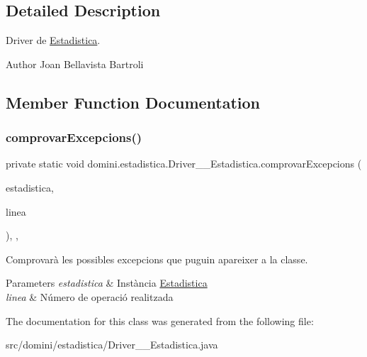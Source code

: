 \subsection{Detailed Description}
Driver de \hyperlink{classdomini_1_1estadistica_1_1Estadistica}{Estadistica}. 

\begin{DoxyAuthor}{Author}
Joan Bellavista Bartroli 
\end{DoxyAuthor}


\subsection{Member Function Documentation}
\mbox{\label{classdomini_1_1estadistica_1_1Driver____Estadistica_a3459f11af9841b23ac81a409a3e84e22}} 
\subsubsection{\texorpdfstring{comprovar\+Excepcions()}{comprovarExcepcions()}}
{\footnotesize\ttfamily private static void domini.\+estadistica.\+Driver\+\_\+\+\_\+\+Estadistica.\+comprovar\+Excepcions (\begin{DoxyParamCaption}\item[{\hyperlink{classdomini_1_1estadistica_1_1Estadistica}{Estadistica}}]{estadistica,  }\item[{String}]{linea }\end{DoxyParamCaption})\hspace{0.3cm}{\ttfamily [inline]}, {\ttfamily [static]}, {\ttfamily [private]}}



Comprovarà les possibles excepcions que puguin apareixer a la classe. 


\begin{DoxyParams}{Parameters}
{\em estadistica} & Instància \hyperlink{classdomini_1_1estadistica_1_1Estadistica}{Estadistica} \\
\hline
{\em linea} & Número de operació realitzada \\
\hline
\end{DoxyParams}


The documentation for this class was generated from the following file\+:\begin{DoxyCompactItemize}
\item 
src/domini/estadistica/Driver\+\_\+\+\_\+\+Estadistica.\+java\end{DoxyCompactItemize}
